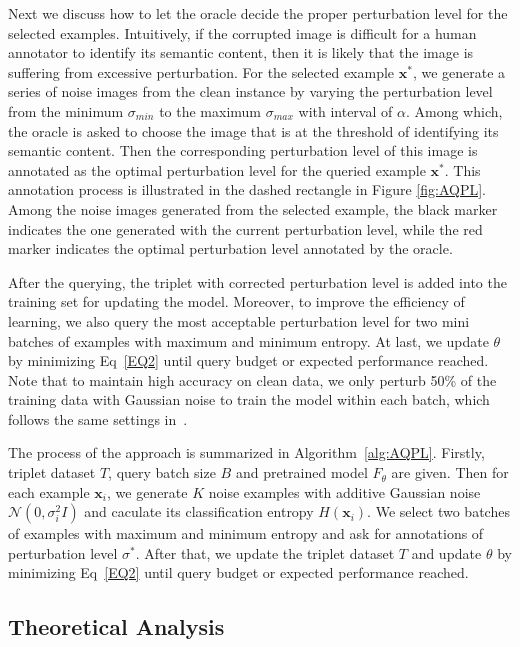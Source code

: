 \documentclass[letterpaper]{article} %
\begin{document}
Next we discuss how to let the oracle decide the proper perturbation level for the selected examples. Intuitively, if the corrupted image is difficult for a human annotator to identify its semantic content, then it is likely that the image is suffering from excessive perturbation. For the selected example $\mathbf{x}^*$, we generate a series of noise images from the clean instance by varying the perturbation level from the minimum $\sigma_{min}$ to the maximum $\sigma_{max}$ with interval of $\alpha$. Among which, the oracle is asked to choose the image that is at the threshold of identifying its semantic content. Then the corresponding perturbation level of this image is annotated as the optimal perturbation level for the queried example $\mathbf{x}^*$. This annotation process is illustrated in the dashed rectangle in Figure \ref{fig:AQPL}. Among the noise images generated from the selected example, the black marker indicates the one generated with the current perturbation level, while the red marker indicates the optimal perturbation level annotated by the oracle.

After the querying, the triplet with corrected perturbation level is added into the training set for updating the model.
Moreover, to improve the efficiency of learning, we also query the most acceptable perturbation level for two mini batches of examples with maximum and minimum entropy. 
At last, we update $\theta$ by minimizing Eq~\ref{EQ2} until query budget or expected performance reached. 
Note that to maintain high accuracy on clean data, we only perturb 50\% of the training data with Gaussian noise to train the model within each batch, which follows the same settings in~\cite{rusak2020increasing}.

The process of the approach is summarized in Algorithm~\ref{alg:AQPL}. Firstly, triplet dataset $T$, query batch size $B$ and pretrained model $F_\theta$ are given. Then for each example $\mathbf{x}_i$, we generate $K$ noise examples with additive Gaussian noise $\mathcal{N}(0,\sigma_i^2 I)$ and caculate its classification entropy $H(\mathbf{x}_i)$. 
We select two batches of examples with maximum and minimum entropy and ask for annotations of perturbation level $\sigma^*$. After that, we update the triplet dataset $T$ and update $\theta$ by minimizing Eq~\ref{EQ2} until query budget or expected performance reached.

\subsection{Theoretical Analysis}
\end{document}
